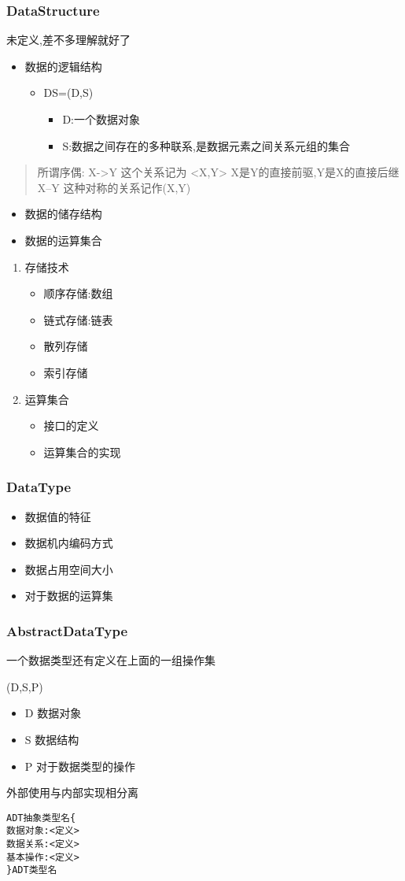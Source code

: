 \documentclass[11pt]{article}
\begin{document}
\subsubsection{DataStructure}
\label{sec:orgc2105a5}
未定义,差不多理解就好了
\begin{itemize}
\item 数据的逻辑结构
\begin{itemize}
\item DS=(D,S)
\begin{itemize}
\item D:一个数据对象
\item S:数据之间存在的多种联系,是数据元素之间关系元组的集合
\end{itemize}
\end{itemize}
\end{itemize}
\begin{quote}
所谓序偶:
X->Y 这个关系记为 <X,Y> X是Y的直接前驱,Y是X的直接后继
X--Y 这种对称的关系记作(X,Y)
\end{quote}
\begin{itemize}
\item 数据的储存结构
\item 数据的运算集合
\end{itemize}

\begin{enumerate}
\item 存储技术
\label{sec:org594962f}
\begin{itemize}
\item 顺序存储:数组
\item 链式存储:链表
\item 散列存储
\item 索引存储
\end{itemize}
\item 运算集合
\label{sec:orgea9e38d}
\begin{itemize}
\item 接口的定义
\item 运算集合的实现
\end{itemize}
\end{enumerate}
\subsubsection{DataType}
\label{sec:org459e943}
\begin{itemize}
\item 数据值的特征
\item 数据机内编码方式
\item 数据占用空间大小
\item 对于数据的运算集
\end{itemize}
\subsubsection{AbstractDataType}
\label{sec:org5471520}
一个数据类型还有定义在上面的一组操作集

(D,S,P)

\begin{itemize}
\item D 数据对象
\item S 数据结构
\item P 对于数据类型的操作
\end{itemize}

外部使用与内部实现相分离
\begin{verbatim}
ADT抽象类型名{
数据对象:<定义>
数据关系:<定义>
基本操作:<定义>
}ADT类型名
\end{verbatim}
\end{document}
